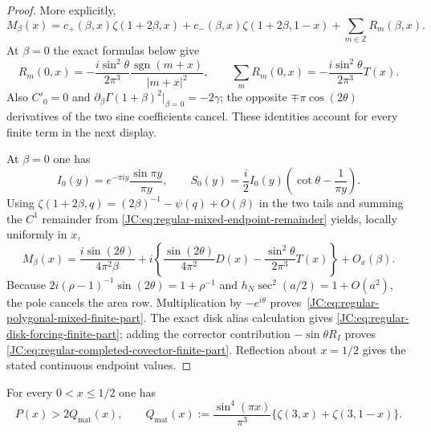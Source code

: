 \begin{proof}
More explicitly,
\[
 M_\beta(x)=c_+(\beta,x)\zeta(1+2\beta,x)
 +c_-(\beta,x)\zeta(1+2\beta,1-x)
 +\sum_{m\in\mathbb Z}R_m(\beta,x).
\]
At $\beta=0$ the exact formulas below give
\[
 R_m(0,x)=-\frac{i\sin^2\theta}{2\pi^3}
 \frac{\operatorname{sgn}(m+x)}{|m+x|^2},
 \qquad
 \sum_mR_m(0,x)=-\frac{i\sin^2\theta}{2\pi^3}T(x).
\]
Also $C'_0=0$ and
$\partial_\beta\Gamma(1+\beta)^2|_{\beta=0}=-2\gamma$; the opposite
$\mp\pi\cos(2\theta)$ derivatives of the two sine coefficients cancel.
These identities account for every finite term in the next display.

At $\beta=0$ one has
\[
 I_0(y)=e^{-\pi iy}\frac{\sin\pi y}{\pi y},\qquad
 S_0(y)=\frac i2I_0(y)
 \left(\cot\theta-\frac1{\pi y}\right).
\]
Using
$\zeta(1+2\beta,q)=(2\beta)^{-1}-\psi(q)+O(\beta)$ in the two tails and
summing the $C^1$ remainder from
\eqref{JC:eq:regular-mixed-endpoint-remainder} yields, locally uniformly in
$x$,
\[
 M_\beta(x)=\frac{i\sin(2\theta)}{4\pi^2\beta}
 +i\left\{\frac{\sin(2\theta)}{4\pi^2}D(x)
 -\frac{\sin^2\theta}{2\pi^3}T(x)\right\}+O_x(\beta).
\]
Because $2i(\rho-1)^{-1}\sin(2\theta)=1+\rho^{-1}$ and
$h_N\sec^2(a/2)=1+O(a^2)$, the pole cancels the area row.  Multiplication
by $-e^{i\theta}$ proves~\eqref{JC:eq:regular-polygonal-mixed-finite-part}.
The exact disk alias calculation gives
\eqref{JC:eq:regular-disk-forcing-finite-part}; adding the corrector
contribution $-\sin\theta R_I$ proves
\eqref{JC:eq:regular-completed-covector-finite-part}.  Reflection about
$x=1/2$ gives the stated continuous endpoint values.
\end{proof}

\begin{proposition}
\label{JC:prop:regular-support-double-disk-gap}
For every $0<x\le1/2$ one has
\begin{equation}\label{JC:eq:regular-support-double-disk-gap}
 \boxed{P(x)>2Q_{\mathrm{mat}}(x)},\qquad
 Q_{\mathrm{mat}}(x):=\frac{\sin^4(\pi x)}{\pi^3}
 \{\zeta(3,x)+\zeta(3,1-x)\}.
\end{equation}
\end{proposition}

